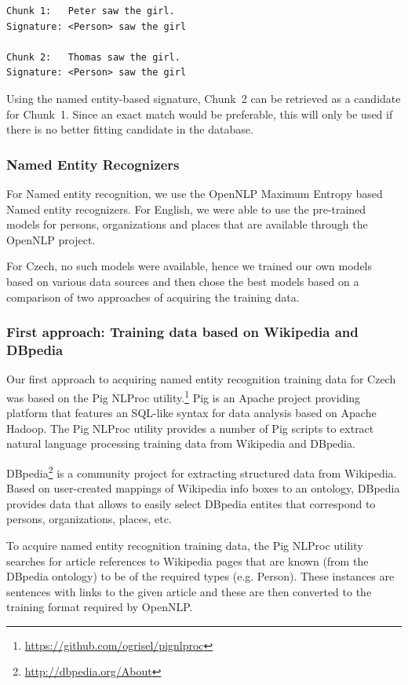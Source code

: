 \begin{lstlisting}
Chunk 1:   Peter saw the girl.
Signature: <Person> saw the girl

Chunk 2:   Thomas saw the girl.
Signature: <Person> saw the girl
\end{lstlisting}

Using the named entity-based signature, Chunk~2 can be retrieved as a
candidate for Chunk~1. Since an exact match would be preferable, this 
will only be used if there is no better fitting candidate in the
database.

\subsubsection{Named Entity Recognizers}

For Named entity recognition, we use the OpenNLP Maximum Entropy based
Named entity recognizers. For English, we were able to use the pre-trained
models for persons, organizations and places that are available through the
OpenNLP project.

For Czech, no such models were available, hence we trained our own models based
on various data sources and then chose the best models based on a comparison 
of two approaches of acquiring the training data.


\subsubsection*{First approach: Training data based on Wikipedia and DBpedia}

Our first approach to acquiring named entity recognition training data for Czech 
was based on the Pig NLProc utility.\footnote{\url{https://github.com/ogrisel/pignlproc}}
Pig is an Apache project providing platform that features an SQL-like syntax
for data analysis based on Apache Hadoop. The Pig NLProc utility provides a number
of Pig scripts to extract natural language processing training data from Wikipedia
and DBpedia.

DBpedia\footnote{\url{http://dbpedia.org/About}} is a community project for extracting 
structured data from Wikipedia. Based on user-created mappings of Wikipedia info boxes to
an ontology, DBpedia provides data that allows to easily select DBpedia entites that 
correspond to persons, organizations, places, etc.

To acquire named entity recognition training data, the Pig NLProc utility searches
for article references to Wikipedia pages that are known (from the DBpedia ontology)
to be of the required types (e.g. Person). These instances are sentences with links
to the given article and these are then converted to the training format required 
by OpenNLP.

